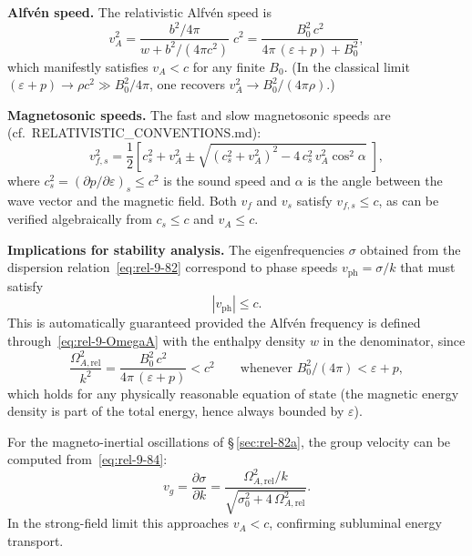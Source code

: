 \medskip\noindent\textbf{Alfv\'en speed.}
The relativistic Alfv\'en speed is
\begin{equation}
  v_{A}^{2}
  = \frac{b^{2}/4\pi}{w + b^{2}/(4\pi c^{2})}\;c^{2}
  = \frac{B_{0}^{2}\,c^{2}}{4\pi\,(\varepsilon + p) + B_{0}^{2}},
  \label{eq:rel-9-vA}
\end{equation}
which manifestly satisfies $v_{A} < c$ for any finite $B_{0}$.  (In
the classical limit $(\varepsilon+p)\to\rho c^{2} \gg B_{0}^{2}/4\pi$,
one recovers $v_{A}^{2}\to B_{0}^{2}/(4\pi\rho)$.)

\medskip\noindent\textbf{Magnetosonic speeds.}
The fast and slow magnetosonic speeds are (cf.\
RELATIVISTIC\_CONVENTIONS.md):
\begin{equation}
  v_{f,s}^{2}
  = \frac{1}{2}\!\left[c_{s}^{2} + v_{A}^{2}
    \pm\sqrt{(c_{s}^{2} + v_{A}^{2})^{2}
    - 4\,c_{s}^{2}\,v_{A}^{2}\cos^{2}\!\alpha}\;\right],
  \label{eq:rel-9-vfs}
\end{equation}
where $c_{s}^{2} = (\partial p/\partial\varepsilon)_{s}\le c^{2}$ is
the sound speed and $\alpha$ is the angle between the wave vector and
the magnetic field.  Both $v_{f}$ and $v_{s}$ satisfy $v_{f,s}\le c$,
as can be verified algebraically from $c_{s}\le c$ and $v_{A}\le c$.

\medskip\noindent\textbf{Implications for stability analysis.}
The eigenfrequencies $\sigma$ obtained from the
dispersion relation~\eqref{eq:rel-9-82} correspond to phase speeds
$v_{\mathrm{ph}} = \sigma/k$ that must satisfy
\begin{equation}
  |v_{\mathrm{ph}}| \le c.
  \label{eq:rel-9-subluminal}
\end{equation}
This is automatically guaranteed provided the Alfv\'en frequency is
defined through~\eqref{eq:rel-9-OmegaA} with the enthalpy density $w$
in the denominator, since
\begin{equation}
  \frac{\Omega_{A,\mathrm{rel}}^{2}}{k^{2}}
  = \frac{B_{0}^{2}\,c^{2}}{4\pi\,(\varepsilon + p)}
  < c^{2}
  \qquad\text{whenever } B_{0}^{2}/(4\pi) < \varepsilon + p,
  \label{eq:rel-9-causal-check}
\end{equation}
which holds for any physically reasonable equation of state (the
magnetic energy density is part of the total energy, hence always
bounded by $\varepsilon$).

For the magneto-inertial oscillations of \S\,\ref{sec:rel-82a}, the
group velocity can be computed from~\eqref{eq:rel-9-84}:
\begin{equation}
  v_{g} = \frac{\partial\sigma}{\partial k}
  = \frac{\Omega_{A,\mathrm{rel}}^{2}/k}
         {\sqrt{\sigma_{0}^{2}
           + 4\,\Omega_{A,\mathrm{rel}}^{2}}}.
  \label{eq:rel-9-vgroup}
\end{equation}
In the strong-field limit this approaches $v_{A} < c$, confirming
subluminal energy transport.

